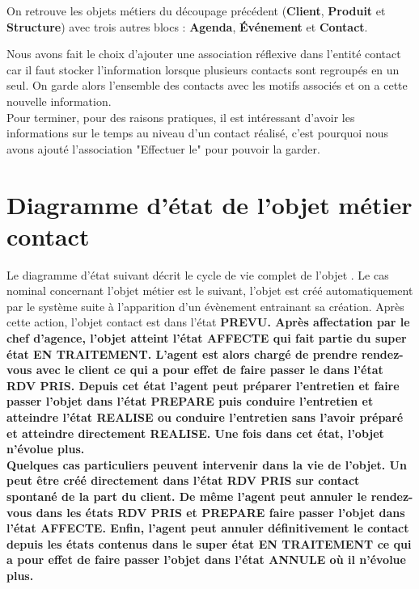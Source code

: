 On retrouve les objets métiers du découpage précédent (\textbf{Client}, \textbf{Produit} et \textbf{Structure}) avec trois autres blocs : \textbf{Agenda}, \textbf{Événement} et \textbf{Contact}. \\


Nous avons fait le choix d'ajouter une association réflexive dans l'entité contact car il faut stocker l'information lorsque plusieurs contacts sont regroupés en un seul. On garde alors l'ensemble des contacts avec les motifs associés et on a cette nouvelle information. \\

Pour terminer, pour des raisons pratiques, il est intéressant d'avoir les informations sur le temps au niveau d'un contact réalisé, c'est pourquoi nous avons ajouté l'association "Effectuer le" pour pouvoir la garder. \\

\section{Diagramme d’état de l'objet métier \bf{contact}}

Le diagramme d'état suivant décrit le cycle de vie complet de l'objet . Le cas nominal concernant l'objet métier  est le suivant, l'objet est créé automatiquement par le système suite à l'apparition d'un évènement entrainant sa création. Après cette action, l'objet contact est dans l'état \bf{PREVU}. Après affectation par le chef d'agence, l'objet  atteint l'état \bf{AFFECTE} qui fait partie du super état \bf{EN TRAITEMENT}. L'agent est alors chargé de prendre rendez-vous avec le client ce qui a pour effet de faire passer le  dans l'état \bf{RDV PRIS}. Depuis cet état l'agent peut préparer l'entretien et faire passer l'objet  dans l'état \bf{PREPARE} puis conduire l'entretien et atteindre l'état \bf{REALISE} ou conduire l'entretien sans l'avoir préparé et atteindre directement \bf{REALISE}. Une fois dans cet état, l'objet  n'évolue plus. \\
Quelques cas particuliers peuvent intervenir dans la vie de l'objet. Un  peut être créé directement dans l'état \bf{RDV PRIS} sur contact spontané de la part du client. De même l'agent peut annuler le rendez-vous dans les états \bf{RDV PRIS} et \bf{PREPARE} faire passer l'objet  dans l'état \bf{AFFECTE}. Enfin, l'agent peut annuler définitivement le contact depuis les états contenus dans le super état \bf{EN TRAITEMENT} ce qui a pour effet de faire passer l'objet  dans l'état \bf{ANNULE} où il n'évolue plus.

